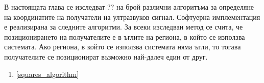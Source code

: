 В настоящата глава се изследват ?? на брой различни алгоритъма за определяне на координатите на получатели на ултразвуков сигнал. Софтуерна имплементация е реализирана за следните алгоритми. За всеки изследван метод се счита, че позиционирането на получателите е в ъглите на региона, в който се използва системата. Ако региона, в който се използва системата няма ъгли, то тогава получателите се позиционират възможно най-далеч един от друг. 

\begin{enumerate}
    \item \ref{squares_algorithm}
\end{enumerate}



\pagebreak



\pagebreak



\pagebreak



\pagebreak



\pagebreak


\pagebreak


\pagebreak